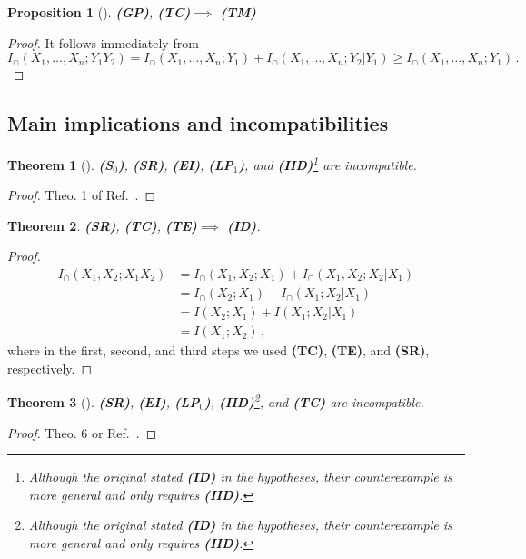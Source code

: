 \documentclass{article}
\newcommand{\ts}[1]{\ensuremath{_{\text{#1}}}}
\newcommand{\SR}{\textbf{(SR)}\xspace} %
\newcommand{\Sz}{\textbf{(S\ts{0})}\xspace} %
\newcommand{\GP}{\textbf{(GP)}\xspace} %
\newcommand{\LPz}{\textbf{(LP\ts{0})}\xspace} %
\newcommand{\ID}{\textbf{(ID)}\xspace} %
\newcommand{\IID}{\textbf{(IID)}\xspace} %
\newcommand{\TM}{\textbf{(TM)}\xspace} %
\newcommand{\TC}{\textbf{(TC)}\xspace} %
\newcommand{\LPo}{\textbf{(LP\ts{1})}\xspace} %
\newcommand{\TE}{\textbf{(TE)}\xspace} %
\newcommand{\EI}{\textbf{(EI)}\xspace} %
\newtheorem{theorem}{Theorem}
\newtheorem{proposition}{Proposition}
\begin{document}
\begin{proposition}[\!\!\cite{bertschinger2013shared}] \label{prop:TC-GP--TM}
    \GP, \TC $\implies$ \TM
\end{proposition}
\begin{proof}
    It follows immediately from
    \begin{equation}
    I_\cap(X_1,\ldots,X_n;Y_1Y_2)=I_\cap(X_1,\ldots,X_n;Y_1)+I_\cap(X_1,\ldots,X_n;Y_2|Y_1)\ge I_\cap(X_1,\ldots,X_n;Y_1) \,.
    \end{equation}
\end{proof}

\subsection{Main implications and incompatibilities}


\begin{theorem}[\!\!\cite{matthias2025novel}]\label{theo:noIID-LP1} 
    \Sz, \SR, \EI, \LPo, and \IID\footnote{Although the original stated \ID in the hypotheses, their counterexample is more general and only requires \IID.} are incompatible. 
\end{theorem}
\begin{proof}
    Theo. 1 of Ref.~\cite{matthias2025novel}.
\end{proof}


\begin{theorem} \label{theo:TC-TE-SR--ID}
    \SR, \TC, \TE $\implies$ \ID.
\end{theorem}
\begin{proof}
    \begin{equation}
        \begin{aligned}
            I_\cap(X_1,X_2;X_1X_2) & = I_\cap(X_1,X_2;X_1) + I_\cap(X_1,X_2;X_2|X_1) \\
            & = I_\cap(X_2;X_1) + I_\cap(X_1;X_2|X_1) \\
            & = I(X_2;X_1) + I(X_1;X_2|X_1) \\
            & = I(X_1;X_2) \,,
        \end{aligned}
    \end{equation}
    where in the first, second, and third steps we used \TC, \TE, and \SR, respectively.
\end{proof}

\begin{theorem}[\!\!\cite{finn2018pointwise}] \label{theo:LPz-ID--noTC}
    \SR, \EI, \LPz, \IID\footnote{Although the original stated \ID in the hypotheses, their counterexample is more general and only requires \IID.}, and \TC are incompatible.
\end{theorem}
\begin{proof}
    Theo. 6 or Ref.~\cite{finn2018pointwise}.
\end{proof}
\end{document}
